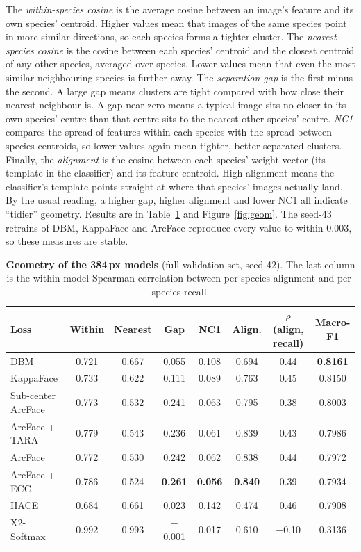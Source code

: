 \documentclass[11pt]{article}
\begin{document}
The \emph{within-species cosine} is the average cosine between an image's feature and
its own species' centroid. Higher values mean that images of the same species point in
more similar directions, so each species forms a tighter cluster. The
\emph{nearest-species cosine} is the cosine between each species' centroid and the
closest centroid of any other species, averaged over species. Lower values mean that even
the most similar neighbouring species is further away. The \emph{separation gap} is the
first minus the second. A large gap means clusters are tight compared with how close
their nearest neighbour is. A gap near zero means a typical image sits no closer to its
own species' centre than that centre sits to the nearest other species' centre. \emph{NC1} compares the spread of features
within each species with the spread between species centroids, so lower values again mean
tighter, better separated clusters. Finally, the \emph{alignment} is the cosine between
each species' weight vector (its template in the classifier) and its feature centroid.
High alignment means the classifier's template points straight at where that species'
images actually land. By the usual reading, a higher gap, higher alignment and lower NC1
all indicate ``tidier'' geometry. Results are in Table~\ref{tab:geom} and
Figure~\ref{fig:geom}. The seed-43 retrains of DBM, KappaFace and ArcFace reproduce
every value to within 0.003, so these measures are stable.

\begin{table}[t]
\centering
\small
\caption{\textbf{Geometry of the 384\,px models} (full validation set, seed 42). The
last column is the within-model Spearman correlation between per-species alignment and
per-species recall.}
\label{tab:geom}
\footnotesize
\setlength{\tabcolsep}{4pt}
\begin{tabular}{@{}lccccccc@{}}
\toprule
Loss & Within & Nearest & Gap & NC1 & Align. & $\rho$(align, recall) & Macro-F1 \\
\midrule
DBM                & 0.721 & 0.667 & 0.055 & 0.108 & 0.694 & 0.44 & \textbf{0.8161} \\
KappaFace          & 0.733 & 0.622 & 0.111 & 0.089 & 0.763 & 0.45 & 0.8150 \\
Sub-center ArcFace & 0.773 & 0.532 & 0.241 & 0.063 & 0.795 & 0.38 & 0.8003 \\
ArcFace + TARA     & 0.779 & 0.543 & 0.236 & 0.061 & 0.839 & 0.43 & 0.7986 \\
ArcFace            & 0.772 & 0.530 & 0.242 & 0.062 & 0.838 & 0.44 & 0.7972 \\
ArcFace + ECC      & 0.786 & 0.524 & \textbf{0.261} & \textbf{0.056} & \textbf{0.840} & 0.39 & 0.7934 \\
HACE               & 0.684 & 0.661 & 0.023 & 0.142 & 0.474 & 0.46 & 0.7908 \\
X2-Softmax         & 0.992 & 0.993 & $-$0.001 & 0.017 & 0.610 & $-$0.10 & 0.3136 \\
\bottomrule
\end{tabular}
\end{table}
\end{document}

